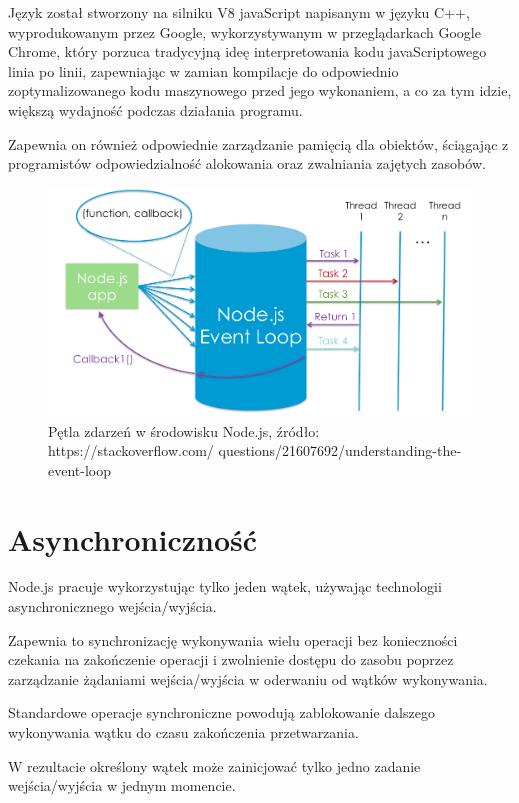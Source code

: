 \documentclass[12pt]{report}
\begin{document}
Język został stworzony na silniku V8 javaScript napisanym w języku C++, wyprodukowanym przez Google, wykorzystywanym w przeglądarkach Google Chrome, który porzuca tradycyjną ideę interpretowania kodu javaScriptowego linia po linii, zapewniając w zamian kompilacje do odpowiednio zoptymalizowanego kodu maszynowego przed jego wykonaniem, a co za tym idzie, większą wydajność podczas działania programu.

Zapewnia on również odpowiednie zarządzanie pamięcią dla obiektów, ściągając z programistów odpowiedzialność alokowania oraz zwalniania zajętych zasobów.

\begin{figure}[!hb]
\centering
\includegraphics[width=\textwidth,height=\textheight,keepaspectratio]{eventLoop.png} 
\caption{Pętla zdarzeń w środowisku Node.js, źródło: https://stackoverflow.com/ questions/21607692/understanding-the-event-loop}
\end{figure}

\section{Asynchroniczność}
Node.js pracuje wykorzystując tylko jeden wątek, używając technologii asynchronicznego wejścia/wyjścia.

Zapewnia to synchronizację wykonywania wielu operacji bez konieczności czekania na zakończenie operacji i zwolnienie dostępu do zasobu poprzez zarządzanie żądaniami wejścia/wyjścia w oderwaniu od wątków wykonywania.

Standardowe operacje synchroniczne powodują zablokowanie dalszego wykonywania wątku do czasu zakończenia przetwarzania.

W rezultacie określony wątek może zainicjować tylko jedno zadanie wejścia/wyjścia w jednym momencie.
\end{document}
